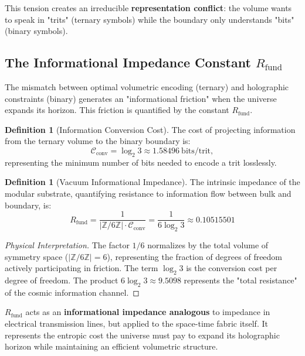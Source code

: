 \documentclass[11pt, a4paper]{article}
\theoremstyle{plain}
\theoremstyle{definition}
\newtheorem{definition}[theorem]{Definition}
\newcommand{\Zmod}{\mathbb{Z}/6\mathbb{Z}}
\newcommand{\Rfactor}{R_{\text{fund}}}
\begin{document}
This tension creates an irreducible \textbf{representation conflict}: the volume wants to speak in "trits" (ternary symbols) while the boundary only understands "bits" (binary symbols).

\subsection{The Informational Impedance Constant \texorpdfstring{$\Rfactor$}{Rfund}}

The mismatch between optimal volumetric encoding (ternary) and holographic constraints (binary) generates an "informational friction" when the universe expands its horizon. This friction is quantified by the constant $\Rfactor$.

\begin{definition}[Information Conversion Cost]
The cost of projecting information from the ternary volume to the binary boundary is:
\begin{equation}
\mathcal{C}_{\text{conv}} = \log_2 3 \approx 1.58496 \ \text{bits/trit},
\end{equation}
representing the minimum number of bits needed to encode a trit losslessly.
\end{definition}

\begin{definition}[Vacuum Informational Impedance]
The intrinsic impedance of the modular substrate, quantifying resistance to information flow between bulk and boundary, is:
\begin{equation}
\boxed{\Rfactor = \frac{1}{|\Zmod| \cdot \mathcal{C}_{\text{conv}}} = \frac{1}{6 \log_2 3} \approx 0.10515501}
\label{eq:rfund_def}
\end{equation}
\end{definition}

\begin{proof}[Physical Interpretation]
The factor $1/6$ normalizes by the total volume of symmetry space ($|\Zmod| = 6$), representing the fraction of degrees of freedom actively participating in friction. The term $\log_2 3$ is the conversion cost per degree of freedom. The product $6\log_2 3 \approx 9.5098$ represents the "total resistance" of the cosmic information channel.
\end{proof}

$\Rfactor$ acts as an \textbf{informational impedance analogous} to impedance in electrical transmission lines, but applied to the space-time fabric itself. It represents the entropic cost the universe must pay to expand its holographic horizon while maintaining an efficient volumetric structure.
\end{document}
